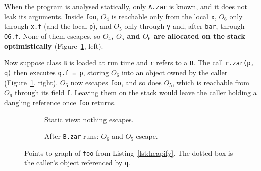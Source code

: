 When the program is analysed statically, only \texttt{A.zar} is known, and it does not leak its
arguments. Inside \texttt{foo}, $O_4$ is reachable only from the local \texttt{x}, $O_6$ only
through \texttt{x.f} (and the local \texttt{p}), and $O_5$ only through \texttt{y} and, after
\texttt{bar}, through \texttt{O6.f}. None of them escapes, so \textbf{$O_4$, $O_5$ and $O_6$ are
allocated on the stack optimistically} (Figure~\ref{fig:pts}, left).

Now suppose class \texttt{B} is loaded at run time and \texttt{r} refers to a \texttt{B}. The
call \texttt{r.zar(p, q)} then executes \texttt{q.f = p}, storing $O_6$ into an object owned by
the caller (Figure~\ref{fig:pts}, right). $O_6$ now escapes \texttt{foo}, and so does $O_5$,
which is reachable from $O_6$ through its field \texttt{f}. Leaving them on the stack would leave
the caller holding a dangling reference once \texttt{foo} returns.

\begin{figure}[htbp]
  \centering
  \begin{subfigure}[b]{0.4\textwidth}
    \centering
    \caption{Static view: nothing escapes.}
  \end{subfigure}
  \qquad
  \begin{subfigure}[b]{0.4\textwidth}
    \centering
    \caption{After \texttt{B.zar} runs: $O_6$ and $O_5$ escape.}
  \end{subfigure}
  \caption{Points-to graph of \texttt{foo} from Listing~\ref{lst:heapify}. The dotted box is the
           caller's object referenced by \texttt{q}.}
  \label{fig:pts}
\end{figure}

